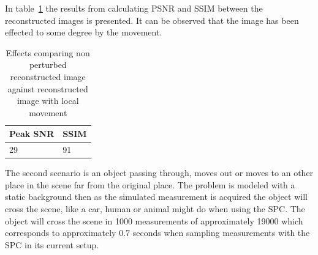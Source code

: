 In table~\ref{tab:local_dyn} the results from calculating PSNR and SSIM between the reconstructed images is presented. It can be observed that the image has been effected to some degree by the movement.

\begin{table}[H]
    \centering
  \begin{tabular}{ | l | l |}
    \hline
    Peak SNR  & SSIM \\ \hline
    29  & 91 \\ 
    \hline
  \end{tabular}
      \caption{Effects comparing non perturbed reconstructed image against reconstructed image with local movement}
    \label{tab:local_dyn}
\end{table}






The second scenario is an object passing through, moves out or moves to an other place in the scene far from the original place. The problem is modeled with a static background then as the simulated measurement is acquired the object will cross the scene, like a car, human or animal might do when using the SPC. The object will cross the scene in 1000 measurements of approximately 19000 which corresponds to approximately $0.7$ seconds when sampling measurements with the SPC in its current setup.\\[0.1in]



